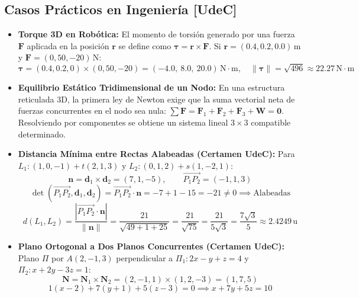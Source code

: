 \documentclass[10pt,letterpaper]{article}
\newcommand{\vn}{\mathbf{N}}
\begin{document}
\subsection{Casos Prácticos en Ingeniería [UdeC]}
\begin{itemize}
    \item \textbf{Torque 3D en Robótica:} El momento de torsión generado por una fuerza $\mathbf{F}$ aplicada en la posición $\mathbf{r}$ se define como $\boldsymbol{\tau} = \mathbf{r} \times \mathbf{F}$. Si $\mathbf{r} = (0.4, 0.2, 0.0)\,\text{m}$ y $\mathbf{F} = (0, 50, -20)\,\text{N}$:
    \[
    \boldsymbol{\tau} = (0.4, 0.2, 0) \times (0, 50, -20) = (-4.0,\ 8.0,\ 20.0)\,\text{N}\cdot\text{m}, \quad \|\boldsymbol{\tau}\| = \sqrt{496} \approx 22.27\,\text{N}\cdot\text{m}
    \]
    \item \textbf{Equilibrio Estático Tridimensional de un Nodo:} En una estructura reticulada 3D, la primera ley de Newton exige que la suma vectorial neta de fuerzas concurrentes en el nodo sea nula: $\sum \mathbf{F} = \mathbf{F}_1 + \mathbf{F}_2 + \mathbf{F}_3 + \mathbf{W} = \mathbf{0}$. Resolviendo por componentes se obtiene un sistema lineal $3 \times 3$ compatible determinado.
    \item \textbf{Distancia Mínima entre Rectas Alabeadas (Certamen UdeC):}
    Para $L_1: (1, 0, -1) + t(2, 1, 3)$ y $L_2: (0, 1, 2) + s(1, -2, 1)$:
    \[
    \mathbf{n} = \mathbf{d}_1 \times \mathbf{d}_2 = (7, 1, -5), \qquad \overrightarrow{P_1P_2} = (-1, 1, 3)
    \]
    \[
    \det(\overrightarrow{P_1P_2}, \mathbf{d}_1, \mathbf{d}_2) = \overrightarrow{P_1P_2} \cdot \mathbf{n} = -7 + 1 - 15 = -21 \neq 0 \implies \text{Alabeadas}
    \]
    \[
    d(L_1, L_2) = \frac{|\overrightarrow{P_1P_2} \cdot \mathbf{n}|}{\|\mathbf{n}\|} = \frac{21}{\sqrt{49+1+25}} = \frac{21}{\sqrt{75}} = \frac{21}{5\sqrt{3}} = \frac{7\sqrt{3}}{5} \approx 2.4249\,\text{u}
    \]
    \item \textbf{Plano Ortogonal a Dos Planos Concurrentes (Certamen UdeC):}
    Plano $\Pi$ por $A(2, -1, 3)$ perpendicular a $\Pi_1: 2x - y + z = 4$ y $\Pi_2: x + 2y - 3z = 1$:
    \[
    \vn = \vn_1 \times \vn_2 = (2, -1, 1) \times (1, 2, -3) = (1, 7, 5)
    \]
    \[
    1(x - 2) + 7(y + 1) + 5(z - 3) = 0 \implies x + 7y + 5z = 10
    \]
\end{itemize}
\end{document}
